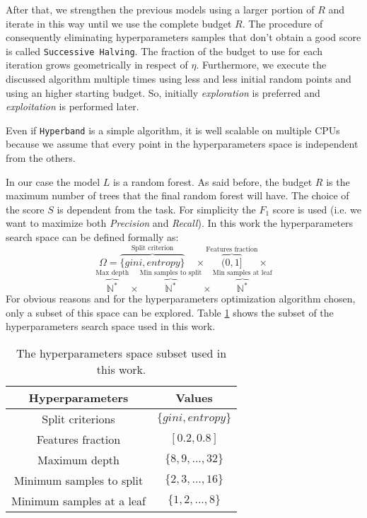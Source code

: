 \documentclass[11pt, a4paper]{article}
\begin{document}
  After that, we strengthen the previous models using a larger portion of $R$ and iterate in this way until we use the complete budget $R$.
  The procedure of consequently eliminating hyperparameters samples that don't obtain a good score is called \texttt{Successive Halving}.
  The fraction of the budget to use for each iteration grows geometrically in respect of $\eta$.
  Furthermore, we execute the discussed algorithm multiple times using less and less initial random points and using an higher starting budget.
  So, initially \textit{exploration} is preferred and \textit{exploitation} is performed later.

  Even if \texttt{Hyperband} is a simple algorithm, it is well scalable on multiple CPUs because we assume that every point in the hyperparameters space is independent from the others.

  In our case the model $L$ is a random forest.
  As said before, the budget $R$ is the maximum number of trees that the final random forest will have.
  The choice of the score $S$ is dependent from the task.
  For simplicity the $F_{1}$ score is used (i.e. we want to maximize both \textit{Precision} and \textit{Recall}).
  In this work the hyperparameters search space can be defined formally as:
  \[\Omega = \overbrace{\{gini, entropy\}}^{\text{Split criterion}} \quad\times \overbrace{(0, 1]}^{\text{Features fraction}} \times\]
  \[\overbrace{\mathbb{N}^{*}}^{\text{Max depth}} \times \overbrace{\mathbb{N}^{*}}^{\text{Min samples to split}} \times \overbrace{\mathbb{N}^{*}}^{\text{Min samples at leaf}}\]
  For obvious reasons and for the hyperparameters optimization algorithm chosen, only a subset of this space can be explored.
  Table \ref{table:hyperparameters} shows the subset of the hyperparameters search space used in this work.

  \begin{table}[b]
    \centering
    \begin{tabular}{|c c|}
      \hline
      Hyperparameters & Values \\
      \hline\hline
      Split criterions & $\{gini, entropy\}$ \\
      \hline
      Features fraction & $[0.2, 0.8]$ \\
      \hline
      Maximum depth & $\{8,9,...,32\}$ \\
      \hline
      Minimum samples to split & $\{2,3,...,16\}$ \\
      \hline
      Minimum samples at a leaf & $\{1,2,...,8\}$ \\
      \hline
    \end{tabular}
    \caption{The hyperparameters space subset used in this work.}
    \label{table:hyperparameters}
  \end{table}
\end{document}
